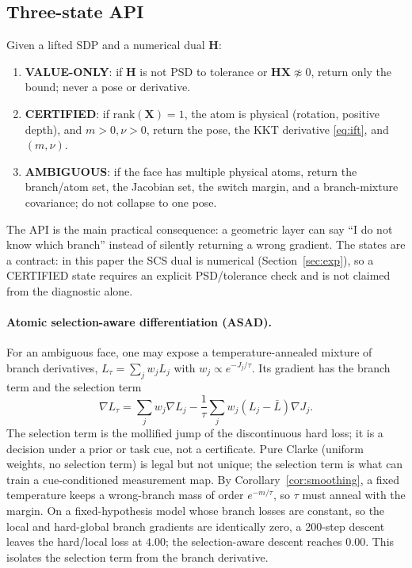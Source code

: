 \documentclass[conference]{IEEEtran}
\newcommand{\bH}{\bm{H}}
\newcommand{\bX}{\bm{X}}
\begin{document}
\subsection{Three-state API}
Given a lifted SDP and a numerical dual $\bH$:
\begin{enumerate}
\item \textbf{VALUE-ONLY}: if $\bH$ is not PSD to tolerance or $\bH\bX\not\approx0$, return only the bound; never a pose or derivative.
\item \textbf{CERTIFIED}: if $\mathrm{rank}(\bX)=1$, the atom is physical (rotation, positive depth), and $m>0,\nu>0$, return the pose, the KKT derivative \eqref{eq:ift}, and $(m,\nu)$.
\item \textbf{AMBIGUOUS}: if the face has multiple physical atoms, return the branch/atom set, the Jacobian set, the switch margin, and a branch-mixture covariance; do not collapse to one pose.
\end{enumerate}
The API is the main practical consequence: a geometric layer can say ``I do not know which branch'' instead of silently returning a wrong gradient. The states are a contract: in this paper the SCS dual is numerical (Section~\ref{sec:exp}), so a CERTIFIED state requires an explicit PSD/tolerance check and is not claimed from the diagnostic alone.

\paragraph{Atomic selection-aware differentiation (ASAD).} For an ambiguous face, one may expose a temperature-annealed mixture of branch derivatives, $L_\tau=\sum_jw_jL_j$ with $w_j\propto e^{-J_j/\tau}$. Its gradient has the branch term and the selection term
\begin{equation}
\nabla L_\tau=\sum_jw_j\nabla L_j-\frac{1}{\tau}\sum_jw_j(L_j-\bar L)\nabla J_j.
\label{eq:selection}
\end{equation}
The selection term is the mollified jump of the discontinuous hard loss; it is a decision under a prior or task cue, not a certificate. Pure Clarke (uniform weights, no selection term) is legal but not unique; the selection term is what can train a cue-conditioned measurement map. By Corollary~\ref{cor:smoothing}, a fixed temperature keeps a wrong-branch mass of order $e^{-m/\tau}$, so $\tau$ must anneal with the margin. On a fixed-hypothesis model whose branch losses are constant, so the local and hard-global branch gradients are identically zero, a 200-step descent leaves the hard/local loss at $4.00$; the selection-aware descent reaches $0.00$. This isolates the selection term from the branch derivative.
\end{document}

